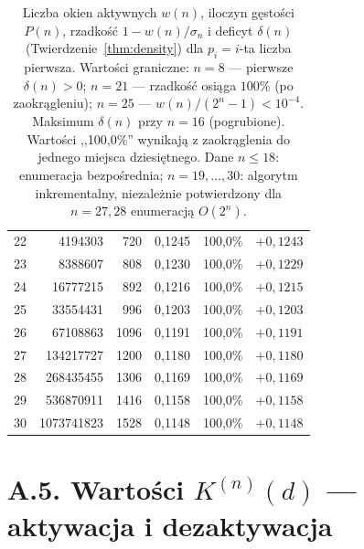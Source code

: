 \begin{table}[H]
\begin{tabular}{r|rrrrr}
22 &    4194303 &  720 & 0{,}1245 &100{,}0\% & $+0{,}1243$ \\
23 &    8388607 &  808 & 0{,}1230 &100{,}0\% & $+0{,}1229$ \\
24 &   16777215 &  892 & 0{,}1216 &100{,}0\% & $+0{,}1215$ \\
25 &   33554431 &  996 & 0{,}1203 &100{,}0\% & $+0{,}1203$ \\
26 &   67108863 & 1096 & 0{,}1191 &100{,}0\% & $+0{,}1191$ \\
27 &  134217727 & 1200 & 0{,}1180 &100{,}0\% & $+0{,}1180$ \\
28 &  268435455 & 1306 & 0{,}1169 &100{,}0\% & $+0{,}1169$ \\
29 &  536870911 & 1416 & 0{,}1158 &100{,}0\% & $+0{,}1158$ \\
30 & 1073741823 & 1528 & 0{,}1148 &100{,}0\% & $+0{,}1148$ \\
\bottomrule
\end{tabular}
\caption{Liczba okien aktywnych $w(n)$, iloczyn gęstości $P(n)$,
rzadkość $1 - w(n)/\sigma_n$
i deficyt $\delta(n)$ (Twierdzenie~\ref{thm:density})
dla $p_i = i$-ta liczba pierwsza.
Wartości graniczne: $n=8$ --- pierwsze $\delta(n) > 0$;
$n=21$ --- rzadkość osiąga $100\%$ (po zaokrągleniu);
$n=25$ --- $w(n)/(2^n-1) < 10^{-4}$.
Maksimum $\delta(n)$ przy $n=16$ (pogrubione).
Wartości ,,100,0\%'' wynikają z zaokrąglenia do jednego miejsca dziesiętnego.
Dane $n \leq 18$: enumeracja bezpośrednia;
$n = 19, \ldots, 30$: algorytm inkrementalny,
niezależnie potwierdzony dla $n=27,28$ enumeracją $O(2^n)$.}
\label{tab:mertens}
\end{table}

\newpage
\section*{A.5. Wartości $K^{(n)}(d)$ --- aktywacja i dezaktywacja}
\label{subsec:a5-wartosci}

